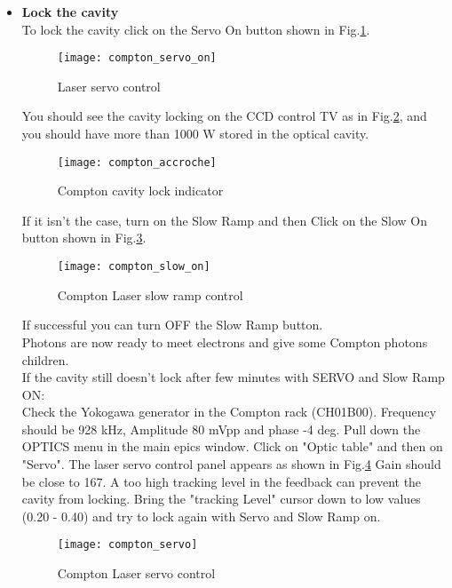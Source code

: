 {{\begin{itemize}
\item {\bf Lock the cavity}\\
	
 To lock the cavity click on the Servo On button shown in Fig.\ref{fig:compton_servo_on}.
 \begin{figure}[htp]
    \begin{center}
        \texttt{[image: compton\_servo\_on]}
    \end{center}
    \caption[compton:servo control]{Laser servo control}
    \label{fig:compton_servo_on}
 \end{figure}
You should see the cavity locking
on the CCD control TV as in  Fig.\ref{fig:compton_accroche}, and you should have more than 1000 W stored
in the optical cavity.
\begin{figure}[htp]
    \begin{center}
        \texttt{[image: compton\_accroche]}
    \end{center}
    \caption[compton:vacity lock]{Compton cavity lock indicator}
    \label{fig:compton_accroche}
\end{figure}

If it isn't the case, turn on the Slow Ramp and then Click on the Slow On button shown in 
Fig.\ref{fig:compton_slow_on}.
\begin{figure}[htp]
    \begin{center}
        \texttt{[image: compton\_slow\_on]}
    \end{center}
    \caption[compton:laser ramp control]{Compton Laser slow ramp control}
    \label{fig:compton_slow_on}
\end{figure}

    If successful you can turn OFF the Slow Ramp button.\\
    Photons are now ready to meet electrons and give some Compton photons children.\\

    If the cavity still doesn't lock after few minutes with SERVO and Slow Ramp ON:\\
Check the Yokogawa generator in the Compton rack (CH01B00).
Frequency should be 928 kHz, Amplitude 80 mVpp and phase -4 deg.
Pull down the OPTICS menu in the main epics window. Click on "Optic table" and then on "Servo".
The laser servo control panel appears as shown in Fig.\ref{fig:compton_servo}
Gain should be close to 167. A too high tracking level in the feedback can prevent the
cavity from locking. Bring the "tracking Level" cursor down to low values (0.20 - 0.40)
and try to lock again with Servo and Slow Ramp on.
\begin{figure}[htp]
    \begin{center}
        \texttt{[image: compton\_servo]}
    \end{center}
    \caption[compton:servo settings]{Compton Laser servo control}
    \label{fig:compton_servo}
\end{figure}


\end{itemize}}}
